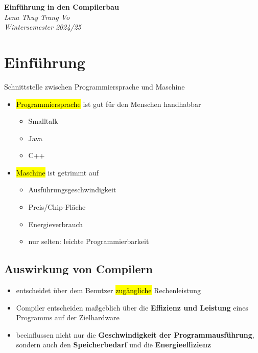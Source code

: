 \documentclass[a4paper, 10pt]{article}
\begin{document}
\begin{titlepage}
    \centering
    \vspace*{3cm}
    {\Huge \textbf{Einführung in den Compilerbau}}\\[1.5cm]
    {\large \textit{Lena Thuy Trang Vo}}\\[0.5cm]
    {\large \textit{Wintersemester 2024/25}}\\[2cm]

    \vfill
\end{titlepage}

\tableofcontents
\newpage

\section{Einführung}
Schnittstelle zwischen Programmiersprache und Maschine
\begin{itemize}
    \item \hl{Programmiersprache} ist gut für den Menschen handhabbar
    \begin{itemize}
        \item Smalltalk
        \item Java
        \item C++
    \end{itemize}

    \item \hl{Maschine} ist getrimmt auf
    \begin{itemize}
        \item Ausführungsgeschwindigkeit
        \item Preis/Chip-Fläche
        \item Energieverbrauch
        \item nur selten: leichte Programmierbarkeit 
    \end{itemize}
\end{itemize}

\subsection{Auswirkung von Compilern}
\begin{itemize}
    \item entscheidet über dem Benutzer \hl{zugängliche} Rechenleistung
    \item Compiler entscheiden maßgeblich über die \textbf{Effizienz und Leistung} eines Programms auf der Zielhardware
    \item beeinflussen nicht nur die \textbf{Geschwindigkeit der Programmausführung}, sondern auch den \textbf{Speicherbedarf} und die \textbf{Energieeffizienz}
\end{itemize}
\end{document}
